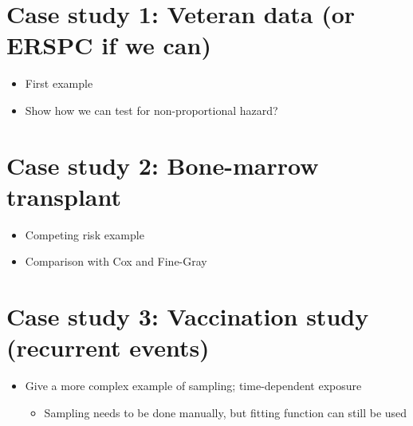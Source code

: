 \documentclass[article]{jss}
\providecommand{\tightlist}{%
  \setlength{\itemsep}{0pt}\setlength{\parskip}{0pt}}
\begin{document}
\section{Case study 1: Veteran data (or ERSPC if we
can)}\label{case-study-1-veteran-data-or-erspc-if-we-can}

\begin{itemize}
\tightlist
\item
  First example
\item
  Show how we can test for non-proportional hazard?
\end{itemize}

\section{Case study 2: Bone-marrow
transplant}\label{case-study-2-bone-marrow-transplant}

\begin{itemize}
\tightlist
\item
  Competing risk example
\item
  Comparison with Cox and Fine-Gray
\end{itemize}

\section{Case study 3: Vaccination study (recurrent
events)}\label{case-study-3-vaccination-study-recurrent-events}

\begin{itemize}
\tightlist
\item
  Give a more complex example of sampling; time-dependent exposure

  \begin{itemize}
  \tightlist
  \item
    Sampling needs to be done manually, but fitting function can still
    be used
  \end{itemize}
\end{itemize}
\end{document}
